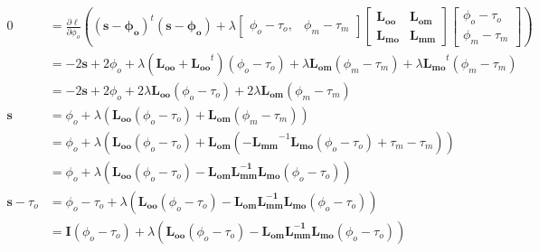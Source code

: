 \documentclass{article}
\begin{document}
        \begin{align}
            0 &= \frac{\partial\ell}{\partial\phi_o}\left((\mathbf{s} - \mathbf{\phi_o}
                )^t(\mathbf{s} - \mathbf{\phi_o}) + \lambda
                \begin{bmatrix}
                    \phi_o - \tau_o, & \phi_m - \tau_m
                \end{bmatrix}
                \begin{bmatrix}
                    \mathbf{L_{oo}} & \mathbf{L_{om}} \\ \mathbf{L_{mo}} & \mathbf{L_{mm}}
                \end{bmatrix}
                \begin{bmatrix}
                    \phi_o - \tau_o \\ \phi_m - \tau_m
                \end{bmatrix}\right)\\
            &= -2\mathbf{s} + 2\phi_o +\lambda\left(\mathbf{L_{oo}} + \mathbf{L_{oo}}^t\right)(
                \phi_o - \tau_o) + \lambda\mathbf{L_{om}}(\phi_m - \tau_m) + \lambda\mathbf{
                L_{mo}}^t(\phi_m - \tau_m) \nonumber\\
            &= -2\mathbf{s} + 2\phi_o + 2\lambda\mathbf{L_{oo}}( \phi_o - \tau_o) + 2\lambda
                \mathbf{L_{om}}(\phi_m - \tau_m) \nonumber\\
            \mathbf{s} &= \phi_o + \lambda\left(\mathbf{L_{oo}}( \phi_o - \tau_o) +
                \mathbf{L_{om}}(\phi_m - \tau_m)\right) \nonumber\\
            &= \phi_o + \lambda\left(\mathbf{L_{oo}}( \phi_o - \tau_o) +
                \mathbf{L_{om}}(-\mathbf{L_{mm}}^{-1}\mathbf{L_{mo}}(
                \phi_o - \tau_o) + \tau_m - \tau_m)\right) \nonumber\\
            &= \phi_o + \lambda\left(\mathbf{L_{oo}}(\phi_o - \tau_o) -
                \mathbf{L_{om}}\mathbf{L_{mm}^{-1}}\mathbf{L_{mo}}(\phi_o - \tau_o)
                \right) \nonumber\\
            \mathbf{s} - \tau_o &= \phi_o - \tau_o + \lambda\left(\mathbf{L_{oo}}(\phi_o - \tau_o) -
                \mathbf{L_{om}}\mathbf{L_{mm}^{-1}}\mathbf{L_{mo}}(\phi_o - \tau_o)
                \right) \nonumber\\
            &= \mathbf{I}(\phi_o - \tau_o) + \lambda\left(\mathbf{L_{oo}}(\phi_o - \tau_o) -
                \mathbf{L_{om}}\mathbf{L_{mm}^{-1}}\mathbf{L_{mo}}(\phi_o - \tau_o)
                \right) \nonumber\\

\end{align}
\end{document}
